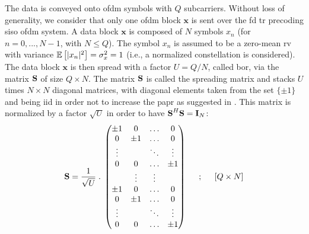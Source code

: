 The data is conveyed onto \gls{ofdm} symbols with $Q$ subcarriers. Without loss of generality, we consider that only one \gls{ofdm} block $\textbf{x}$ is sent over the \gls{fd} \gls{tr} precoding \gls{siso} \gls{ofdm} system. A data block $\textbf{x}$ is composed of $N$ symbols $x_n$ (for $n = 0,..., N-1$, with $N\leq Q$). The symbol $x_n$ is assumed to be a zero-mean \gls{rv} with variance $\mathbb{E} \left[|x_n|^2\right] = \sigma_x^2 = 1$ (i.e., a normalized constellation is considered). The data block $\textbf{x}$ is then spread with a factor $U = Q/N$, called \gls{bor}, via the matrix $\textbf{S}$ of size $Q\times N$. The matrix $\textbf{S}$ is called the spreading matrix and stacks $U$ times $N\times N$ diagonal matrices, with diagonal elements taken from the set $\{\pm1\}$ and being \gls{iid} in order not to increase the \gls{papr} as suggested in \cite{4394231}. 
This matrix is normalized by a factor $\sqrt{U}$ in order to have $\textbf{S}^H \textbf{S} = \textbf{I}_N$:
\begin{equation}
\textbf{S}= \frac{1}{\sqrt{U}} \; . \;
   \begin{pmatrix}
    \pm 1 & 0 & \hdots & 0 \\
    0 & \pm 1 & \hdots & 0 \\
    \vdots & & \ddots & \vdots \\
    0 & 0 & \hdots & \pm 1 \\
     & \vdots& \vdots& \\
    \pm 1 & 0 & \hdots & 0 \\
    0 & \pm 1 & \hdots & 0 \\
    \vdots & & \ddots & \vdots \\
    0 & 0 & \hdots & \pm 1
 \end{pmatrix}
  \hspace{.2in} ; \hspace{.2in} [Q \times N]
 \label{eq:spread_mat}
\end{equation}
